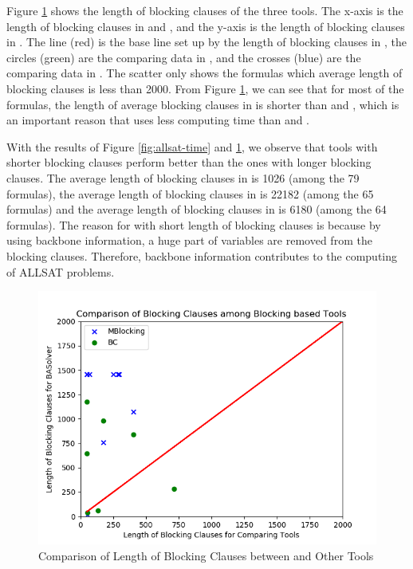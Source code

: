 Figure \ref{fig:allsat-blk} shows the length of blocking clauses of the three tools. The x-axis is the length of blocking clauses in \ctool and \bc, and the y-axis is the length of blocking clauses in \tool. The line (red) is the base line set up by the length of blocking clauses in \tool, the circles (green) are the comparing data in \bc, and the crosses (blue) are the comparing data in \ctool. The scatter only shows the formulas which average length of blocking clauses is less than 2000. From Figure \ref{fig:allsat-blk}, we can see that for most of the formulas, the length of average blocking clauses in \tool is shorter than \ctool and \bc, which is an important reason that \tool uses less computing time than \ctool and \bc.

With the results of Figure \ref{fig:allsat-time} and \ref{fig:allsat-blk}, we observe that tools with shorter blocking clauses perform better than the ones with longer blocking clauses.
The average length of blocking clauses in \tool is 1026 (among the 79 formulas), the average length of blocking clauses in \ctool is 22182 (among the 65 formulas) and the average length of blocking clauses in \bc is 6180 (among the 64 formulas).
The reason for \tool with short length of blocking clauses is because by using backbone information, a huge part of variables are removed from the blocking clauses. Therefore, backbone information contributes to the computing of ALLSAT problems.

\begin{figure}
    \centering
    \includegraphics[scale=0.5]{allsat-blk.png}
    \caption{Comparison of Length of Blocking Clauses between \tool and Other Tools}
    \label{fig:allsat-blk}
\end{figure}

